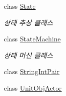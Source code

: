 \begin{DoxyCompactItemize}
class \hyperlink{class_f_z_1_1_state}{State}
\begin{DoxyCompactList}\small\item\em 상태 추상 클래스 \end{DoxyCompactList}\item 
class \hyperlink{class_f_z_1_1_state_machine}{State\+Machine}
\begin{DoxyCompactList}\small\item\em 상태 머신 클래스 \end{DoxyCompactList}\item 
class \hyperlink{class_f_z_1_1_string_int_pair}{String\+Int\+Pair}
\item 
class \hyperlink{class_f_z_1_1_unit_obj_actor}{Unit\+Obj\+Actor}
\end{DoxyCompactItemize}

